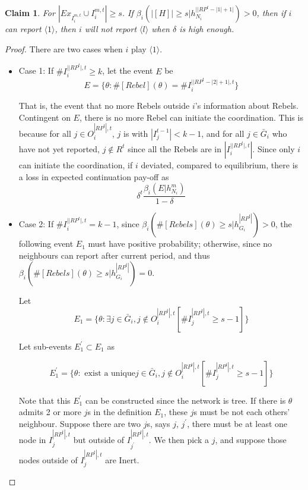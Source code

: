 \documentclass[12pt]{article}
\newtheorem{claim}{Claim}[subsubsection]
\theoremstyle{remark}
\theoremstyle{remark}
\begin{document}
\begin{claim}
\label{claim_must_report_1}
For $|Ex_{I^{m,t}_i}\cup I^{m,t}_i|\geq s$. If $\beta_{i}(|[H]|\geq s|h^{||RP^t-|1|+1|}_{N_i})>0$, then if $i$ can report $\langle 1 \rangle$, then $i$ will not report $\langle l \rangle$ when $\delta$ is high enough.
\end{claim}

\begin{proof}

There are two cases when $i$ play $\langle 1 \rangle$.
\begin{itemize}

\item Case 1: If $\#I^{||RP^t|,t}_i\geq k$, let the event $E$ be
\[E=\{\theta: \#[Rebel](\theta)=\# I^{||RP^t-|2|+1|,t}_i\}\]

That is, the event that no more Rebels outside $i$'s information about Rebels. Contingent on $E$, there is no more Rebel can initiate the coordination. This is because for all $j\in O^{|RP^t|,t}_i$, $j$ is with $|I^{t-1}_j|< k-1$, and for all $j\in \bar{G}_i$ who have not yet reported, $j\not\in R^t$ since all the Rebels are in $|I^{||RP^t|,t}_i|$. Since only $i$ can initiate the coordination, if $i$ deviated, compared to equilibrium, there is a loss in expected continuation pay-off as
\[\delta^{t}\frac{\beta_{i}(E|h^{m}_{N_i})}{1-\delta}\]

\item Case 2: If $\#I^{||RP^t|,t}_i= k-1$, since $\beta_{i}(\#[Rebels](\theta)\geq s|h^{|RP^t|}_{G_i})>0$, the following event $E_1$ must have positive probability; otherwise, since no neighbours can report after current period, and thus $\beta_{i}(\#[Rebels](\theta)\geq s|h^{|RP^t|}_{G_i})=0$.

Let
\[E_1=\{\theta: \exists j\in \bar{G}_i, j\notin O^{|RP^t|,t}_i [\#I^{|RP^t|,t}_j\geq s-1]\}\]


Let sub-events $E^{'}_1\subset E_1$ as

\[E^{'}_1=\{\theta: \text{ exist a unique} j\in \bar{G}_i, j\notin O^{|RP^t|,t}_i [\#I^{|RP^t|,t}_j\geq s-1]\}\] 

Note that this $E^{'}_1$ can be constructed since the network is tree. If there is $\theta$ admits 2 or more $j$s in the definition $E_1$, these $j$s must be not each others' neighbour. Suppose there are two $j$s, says $j$, $j^{'}$, there must be at least one node in $I^{|RP^t|,t}_j$ but outside of $I^{|RP^t|,t}_{j^{'}}$. We then pick a $j$, and suppose those nodes outside of $I^{|RP^t|,t}_j$ are Inert.


\end{itemize}
\end{proof}
\end{document}
